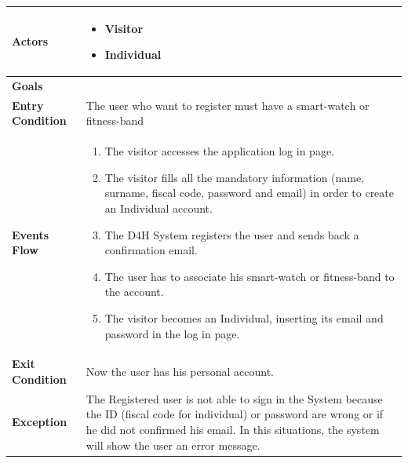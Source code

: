 \begin{table}[H]
                \begin{tabular}{|p{3cm}|p{8.2cm}|}
                    \hline
                    \textbf{Actors} & \begin{itemize}
                                          \item Visitor
                                          \item Individual
                                      \end{itemize}\\
                    \hline
                    \textbf{Goals} & \\ 
                     \hline
                    \textbf{Entry Condition} & The user who want to register must have a smart-watch or fitness-band\\
                     \hline
                    \textbf{Events Flow} & \begin{enumerate}
                                                \item The visitor accesses the application log in page.
                                                \item The visitor fills all the mandatory information (name, surname, fiscal code, password and email) in order to create an Individual account.
                                                \item The D4H System registers the user and sends back a confirmation email.
                                                \item The user has to associate his smart-watch or fitness-band to the account.
                                                \item The visitor becomes an Individual, inserting its email and password in the log in page.
                                            \end{enumerate}\\
                     \hline
                    \textbf{Exit Condition} & Now the user has his personal account.\\
                     \hline
                    \textbf{Exception} & The Registered user is not able to sign in the System because the ID (fiscal code for individual) or password are wrong or if he did not confirmed his email. In this situations, the system will show the user an error message.\\
                     \hline
                \end{tabular}  
            \end{table}
        
